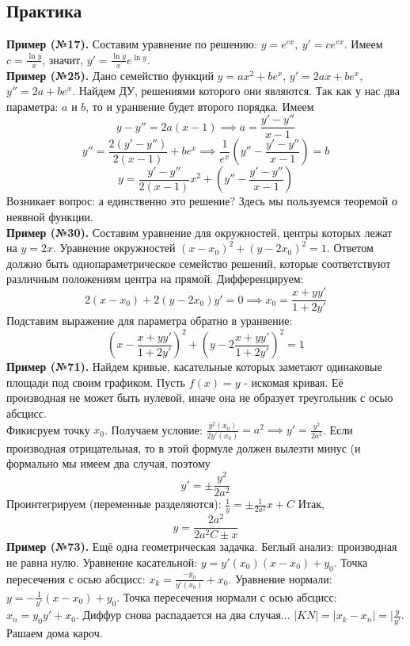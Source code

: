 \subsection{Практика}
\textbf{Пример (№17).} Составим уравнение по решению: $y=e^{cx},~y'=ce^{cx}$.
Имеем $c=\frac{\ln{y}}{x}$, значит, $y'=\frac{\ln{y}}{x}e^{\ln{y}}$.\\
\textbf{Пример (№25).} Дано семейство функций $y=ax^2+be^x$, $y'=2ax+be^x$,
$y''=2a+be^x$. Найдем ДУ, решениями которого они являются. Так как у нас два 
параметра: $a$ и  $b$, то и уранвение будет второго порядка. Имеем
$$y-y''=2a(x-1)\implies a=\frac{y'-y''}{x-1}$$ 
$$y''=\frac{2(y'-y'')}{2(x-1)}+be^x\implies \frac{1}{e^x}(y''-
\frac{y'-y''}{x-1})=b$$ 
$$y=\frac{y'-y''}{2(x-1)}x^2+(y''-\frac{y'-y''}{x-1})$$
Возникает вопрос: а единственно это решение? Здесь мы пользуемся теоремой о 
неявной функции.\\
\textbf{Пример (№30).} Составим уравнение для окружностей, центры которых 
лежат на $y=2x$. Уравнение окружностей  $(x-x_0)^2+(y-2x_0)^2=1$. Ответом 
должно быть однопараметрическое семейство решений, которые соответствуют 
различным положениям центра на прямой. Дифференцируем:
$$2(x-x_0)+2(y-2x_0)y'=0\implies x_0=\frac{x+yy'}{1+2y'}$$
Подставим выражение для параметра обратно в уранвение:
$$(x-\frac{x+yy'}{1+2y'})^2+(y-2\frac{x+yy'}{1+2y'})^2=1$$
\textbf{Пример (№71).} Найдем кривые, касательные которых заметают 
одинаковые площади под своим графиком. Пусть $f(x)=y$ - искомая кривая. 
Её производная не может быть нулевой, иначе она не образует треугольник
с осью абсцисс. \\
Фикисруем точку  $x_0$.  Получаем условие: $\frac{y^2(x_0)}{2y'(x_0)}=a^2
\implies y'=\frac{y^2}{2a^2}$. Если производная отрицательная, то в этой 
формуле должен вылезти минус (и формально мы имеем два случая, поэтому 
$$y'=\pm\frac{y^2}{2a^2}$$
Проинтегрируем (переменные разделяются):
$\frac{1}{y}=\pm \frac{1}{2a^2}x+C$
Итак, $$y=\frac{2a^2}{2a^2C\pm x}$$
\textbf{Пример (№73).} Ещё одна геометрическая задачка. Беглый анализ: 
производная не равна нулю. Уравнение касательной: $y=y'(x_0)(x-x_0)+y_0$.
Точка пересечения с осью абсцисс: $x_k=\frac{-y_0}{y'(x_0)}+x_0$.
Уравнение нормали: $y=-\frac{1}{y'}(x-x_0)+y_0$. Точка пересечения нормали с
осью абсцисс: $x_n=y_0y'+x_0$. Диффур снова распадается на два случая...
$|KN|=|x_k-x_n|=|\frac{y}{y'}$. Рашаем дома кароч. 
